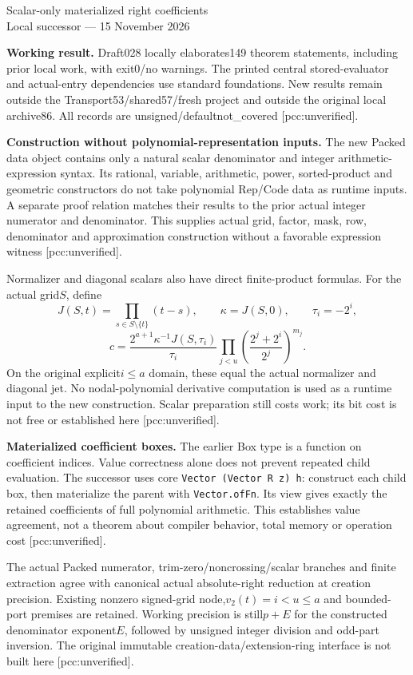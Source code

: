 \documentclass[10pt]{article}
\begin{document}
\begin{center}{\Large Scalar-only materialized right coefficients}\\[4pt]
Local successor --- 15 November 2026\end{center}
\textbf{Working result.} Draft028 locally elaborates149 theorem statements,
including prior local work, with exit0/no warnings. The printed central
stored-evaluator and actual-entry dependencies use standard foundations.
New results remain outside the Transport53/shared57/fresh project and
outside the original local archive86. All records are unsigned/defaultnot\_covered
[pcc:unverified].

\textbf{Construction without polynomial-representation inputs.}
The new Packed data object contains only a natural scalar denominator and
integer arithmetic-expression syntax. Its rational, variable, arithmetic,
power, sorted-product and geometric constructors do not take polynomial
Rep/Code data as runtime inputs. A separate proof relation matches their
results to the prior actual integer numerator and denominator. This supplies
actual grid, factor, mask, row, denominator and approximation construction without a
favorable expression witness [pcc:unverified].

Normalizer and diagonal scalars also have direct finite-product formulas.
For the actual grid$S$, define
\[
 J(S,t)=\prod_{s\in S\setminus\{t\}}(t-s),\qquad
 \kappa=J(S,0),\qquad \tau_i=-2^i,
\]
\[
 c=\frac{2^{a+1}\kappa^{-1}J(S,\tau_i)}{\tau_i}
     \prod_{j<u}\left(\frac{2^j+2^i}{2^j}\right)^{m_j}.
\]
On the original explicit$i\le a$ domain, these equal the actual normalizer
and diagonal jet. No nodal-polynomial derivative computation is used as a
runtime input to the new construction. Scalar preparation still costs work;
its bit cost is not free or established here [pcc:unverified].

\textbf{Materialized coefficient boxes.} The earlier Box type is a function
on coefficient indices. Value correctness alone does not prevent repeated
child evaluation. The successor uses core
\texttt{Vector (Vector R z) h}: construct each child box, then materialize
the parent with \texttt{Vector.ofFn}. Its view gives exactly the retained
coefficients of full polynomial arithmetic. This establishes value agreement,
not a theorem about compiler behavior, total memory or operation cost
[pcc:unverified].

The actual Packed numerator, trim-zero/noncrossing/scalar branches and finite
extraction agree with canonical actual absolute-right reduction at creation
precision. Existing nonzero signed-grid node,$v_2(t)=i<u\le a$ and bounded-port
premises are retained. Working precision is still$p+E$ for the constructed
denominator exponent$E$, followed by unsigned integer division and odd-part
inversion. The original immutable creation-data/extension-ring interface is
not built here [pcc:unverified].
\end{document}

